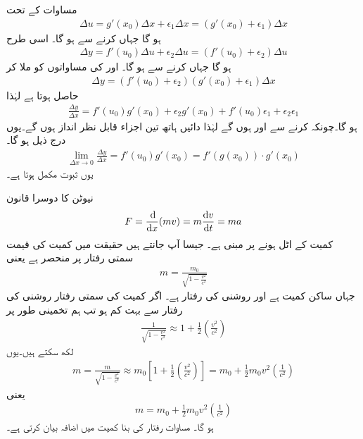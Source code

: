 مساوات  کے تحت
\begin{align*}
\Delta u=g'(x_0)\Delta x+\epsilon_1\Delta x=(g'(x_0)+\epsilon_1)\Delta x
\end{align*}
ہو گا جہاں  کرنے سے  ہو گا۔ اسی طرح
\begin{align*}
\Delta y=f'(u_0)\Delta u+\epsilon_2\Delta u=(f'(u_0)+\epsilon_2)\Delta u
\end{align*}
ہو گا جہاں  کرنے سے  ہو گا۔  اور  کی مساواتوں کو ملا کر 
\begin{align*}
\Delta y=(f'(u_0)+\epsilon_2)(g'(x_0)+\epsilon_1)\Delta x
\end{align*}
حاصل ہوتا ہے لہٰذا
\begin{align*}
\frac{\Delta y}{\Delta x}=f'(u_0)g'(x_0)+\epsilon_2g'(x_0)+f'(u_0)\epsilon_1+\epsilon_2\epsilon_1
\end{align*}
ہو گا۔چونکہ  کرنے سے  اور  ہوں گے لہٰذا دائیں ہاتھ تین اجزاء قابل نظر انداز ہوں گے۔یوں درج ذیل ہو گا۔
\begin{align*}
\lim_{\Delta x\to 0}\frac{\Delta y}{\Delta x}=f'(u_0)g'(x_0)=f'(g(x_0))\cdot g'(x_0)
\end{align*}
یوں ثبوت مکمل ہوتا ہے۔

نیوٹن کا دوسرا قانون
\begin{align*}
F=\frac{\dif}{\dif x}(mv)=m\frac{\dif v}{\dif t}=ma
\end{align*}
کمیت کے اٹل ہونے پر مبنی ہے۔ جیسا آپ جانتے ہیں حقیقت میں کمیت کی قیمت سمتی رفتار پر منحصر ہے یعنی
\begin{align*}
m=\frac{m_0}{\sqrt{1-\tfrac{v^2}{c^2}}}
\end{align*}
جہاں ساکن کمیت  ہے اور روشنی کی رفتار  ہے۔ اگر کمیت کی سمتی رفتار  روشنی کی رفتار سے بہت کم ہو تب ہم تخمینی طور پر 
\begin{align*}
\frac{1}{\sqrt{1-\tfrac{v^2}{c^2}}}\approx 1+\frac{1}{2}(\tfrac{v^2}{c^2})
\end{align*}
لکھ سکتے ہیں۔یوں
\begin{align*}
m=\frac{m}{\sqrt{1-\tfrac{v^2}{c^2}}}\approx m_0[1+\frac{1}{2}(\tfrac{v^2}{c^2})]=m_0+\frac{1}{2}m_0v^2(\tfrac{1}{c^2})
\end{align*}
یعنی
\begin{align}\label{مساوات_استعمال_کمیت_میں_اضافہ}
m=m_0+\frac{1}{2}m_0v^2(\tfrac{1}{c^2})
\end{align}
ہو گا۔ مساوات  رفتار کی بنا کمیت میں اضافہ بیان کرتی ہے۔


